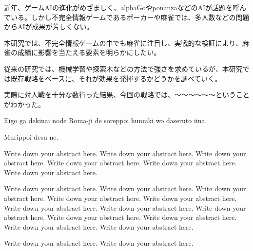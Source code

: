 
\begin{jabstract}

近年、ゲームAIの進化がめざましく、alphaGoやponanzaなどのAIが話題を呼んでいる。しかし不完全情報ゲームであるポーカーや麻雀では、多人数などの問題からAIが成果が芳しくない。

本研究では、不完全情報ゲームの中でも麻雀に注目し、実戦的な検証により、麻雀の成績に影響を当たえる要素を明らかにしたい。

従来の研究では、機械学習や探索木などの方法で強さを求めているが、本研究では既存戦略をベースに、それが効果を発揮するかどうかを調べていく。

実際に対人戦を十分な数行った結果、今回の戦略では、〜〜〜〜〜〜ということがわかった。

\end{jabstract}


\begin{eabstract}

Eigo ga dekinai node Roma-ji de soreppoi hunniki wo daseruto iina.

Murippoi desu ne.

Write down your abstract here. Write down your abstract here. Write down your abstract here. Write down your abstract here. Write down your abstract here. Write down your abstract here.

 Write down your abstract here. Write down your abstract here. Write down your abstract here. Write down your abstract here. Write down your abstract here. Write down your abstract here. Write down your abstract here. Write down your abstract here. Write down your abstract here. Write down your abstract here. Write down your abstract here. Write down your abstract here.

Write down your abstract here. Write down your abstract here.

\end{eabstract}

